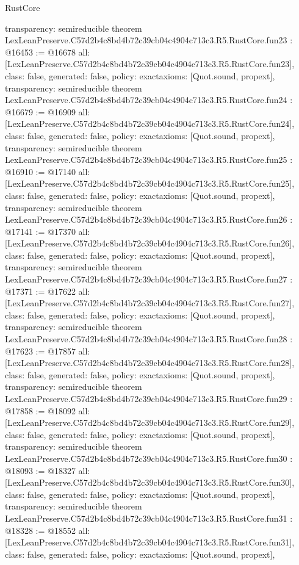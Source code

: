 \begin{lexlean}{RustCore}
\begin{coremodule}
{  transparency: semireducible
}
theorem LexLeanPreserve.C57d2b4c8bd4b72c39cb04c4904c713c3.R5.RustCore.fun23 : @16453 := @16678 {
  all: [LexLeanPreserve.C57d2b4c8bd4b72c39cb04c4904c713c3.R5.RustCore.fun23],
  class: false,
  generated: false,
  policy: exact{axioms: [Quot.sound, propext]},
  transparency: semireducible
}
theorem LexLeanPreserve.C57d2b4c8bd4b72c39cb04c4904c713c3.R5.RustCore.fun24 : @16679 := @16909 {
  all: [LexLeanPreserve.C57d2b4c8bd4b72c39cb04c4904c713c3.R5.RustCore.fun24],
  class: false,
  generated: false,
  policy: exact{axioms: [Quot.sound, propext]},
  transparency: semireducible
}
theorem LexLeanPreserve.C57d2b4c8bd4b72c39cb04c4904c713c3.R5.RustCore.fun25 : @16910 := @17140 {
  all: [LexLeanPreserve.C57d2b4c8bd4b72c39cb04c4904c713c3.R5.RustCore.fun25],
  class: false,
  generated: false,
  policy: exact{axioms: [Quot.sound, propext]},
  transparency: semireducible
}
theorem LexLeanPreserve.C57d2b4c8bd4b72c39cb04c4904c713c3.R5.RustCore.fun26 : @17141 := @17370 {
  all: [LexLeanPreserve.C57d2b4c8bd4b72c39cb04c4904c713c3.R5.RustCore.fun26],
  class: false,
  generated: false,
  policy: exact{axioms: [Quot.sound, propext]},
  transparency: semireducible
}
theorem LexLeanPreserve.C57d2b4c8bd4b72c39cb04c4904c713c3.R5.RustCore.fun27 : @17371 := @17622 {
  all: [LexLeanPreserve.C57d2b4c8bd4b72c39cb04c4904c713c3.R5.RustCore.fun27],
  class: false,
  generated: false,
  policy: exact{axioms: [Quot.sound, propext]},
  transparency: semireducible
}
theorem LexLeanPreserve.C57d2b4c8bd4b72c39cb04c4904c713c3.R5.RustCore.fun28 : @17623 := @17857 {
  all: [LexLeanPreserve.C57d2b4c8bd4b72c39cb04c4904c713c3.R5.RustCore.fun28],
  class: false,
  generated: false,
  policy: exact{axioms: [Quot.sound, propext]},
  transparency: semireducible
}
theorem LexLeanPreserve.C57d2b4c8bd4b72c39cb04c4904c713c3.R5.RustCore.fun29 : @17858 := @18092 {
  all: [LexLeanPreserve.C57d2b4c8bd4b72c39cb04c4904c713c3.R5.RustCore.fun29],
  class: false,
  generated: false,
  policy: exact{axioms: [Quot.sound, propext]},
  transparency: semireducible
}
theorem LexLeanPreserve.C57d2b4c8bd4b72c39cb04c4904c713c3.R5.RustCore.fun30 : @18093 := @18327 {
  all: [LexLeanPreserve.C57d2b4c8bd4b72c39cb04c4904c713c3.R5.RustCore.fun30],
  class: false,
  generated: false,
  policy: exact{axioms: [Quot.sound, propext]},
  transparency: semireducible
}
theorem LexLeanPreserve.C57d2b4c8bd4b72c39cb04c4904c713c3.R5.RustCore.fun31 : @18328 := @18552 {
  all: [LexLeanPreserve.C57d2b4c8bd4b72c39cb04c4904c713c3.R5.RustCore.fun31],
  class: false,
  generated: false,
  policy: exact{axioms: [Quot.sound, propext]},
}
\end{coremodule}
\end{lexlean}
